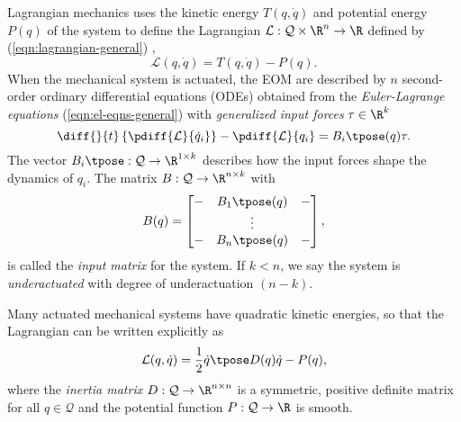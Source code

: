 Lagrangian mechanics uses the kinetic energy \(T(q,\dot{q})\) and potential
energy \(P(q)\) of the system to define the Lagrangian 
\(\mathcal{L} : \mathcal{Q}\times\R^n \rightarrow \R\) defined by
(\ref{eqn:lagrangian-general}) \cite{greenwood_dynamics},
\begin{equation}\label{eqn:lagrangian-general}
    \mathcal{L}(q,\dot{q}) = T(q,\dot{q}) - P(q)
    .
\end{equation}
When the mechanical system is actuated, the EOM are described by \(n\) second-order
ordinary differential equations (ODEs) obtained from the \textit{Euler-Lagrange
equations} (\ref{eqn:el-eqns-general}) with \textit{generalized input forces} 
\(\tau \in \R^k\)
\begin{equation}\label{eqn:el-eqns-general}
    \diff{}{t}\left\{ \pdiff{\mathcal{L}}{\dot{q}_i} \right\}
    - \pdiff{\mathcal{L}}{q_i} = B_i\tpose(q) \tau
    .
\end{equation}
The vector \(B_i\tpose: \mathcal{Q} \rightarrow \R^{1\times k}\) describes how
the input forces shape the dynamics of \(q_i\).
The matrix  \(B: \mathcal{Q} \rightarrow \R^{n \times k}\) with
\[
    B(q) = \begin{bmatrix}
        - & B_1\tpose(q) & - \\
          & \vdots & \\
        - & B_n\tpose(q) & - \\
    \end{bmatrix}
    ,
\]
is called the \textit{input matrix} for the system.
If \(k < n\), we say the system is \textit{underactuated} with degree of
underactuation \((n - k)\).

Many actuated mechanical systems have quadratic kinetic energies, so that the
Lagrangian can be written explicitly as
\begin{equation}\label{eqn:lagrangian}
    \mathcal{L}(q,\dot{q}) = \frac{1}{2} \dot{q}\tpose D(q) \dot{q} - P(q)
    ,
\end{equation}
where the \textit{inertia matrix} \(D: \mathcal{Q} \rightarrow \R^{n\times n}\) 
is a symmetric, positive definite matrix for all \(q \in \mathcal{Q}\) and the
potential function \(P : \mathcal{Q} \rightarrow \R\) is smooth. 

